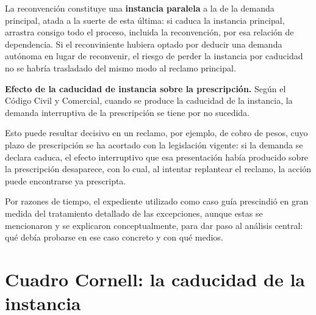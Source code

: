 \documentclass[12pt,oneside]{book}
\begin{document}
La reconvención constituye una \textbf{instancia paralela} a la de la demanda principal, atada a la suerte de esta última: si caduca la instancia principal, arrastra consigo todo el proceso, incluida la reconvención, por esa relación de dependencia. Si el reconviniente hubiera optado por deducir una demanda autónoma en lugar de reconvenir, el riesgo de perder la instancia por caducidad no se habría trasladado del mismo modo al reclamo principal.

\begin{important}
\textbf{Efecto de la caducidad de instancia sobre la prescripción.} Según el Código Civil y Comercial, cuando se produce la caducidad de la instancia, la demanda interruptiva de la prescripción se tiene por no sucedida.

Esto puede resultar decisivo en un reclamo, por ejemplo, de cobro de pesos, cuyo plazo de prescripción se ha acortado con la legislación vigente: si la demanda se declara caduca, el efecto interruptivo que esa presentación había producido sobre la prescripción desaparece, con lo cual, al intentar replantear el reclamo, la acción puede encontrarse ya prescripta.
\end{important}

Por razones de tiempo, el expediente utilizado como caso guía prescindió en gran medida del tratamiento detallado de las excepciones, aunque estas se mencionaron y se explicaron conceptualmente, para dar paso al análisis central: qué debía probarse en ese caso concreto y con qué medios.

\section*{Cuadro Cornell: la caducidad de la instancia}
\end{document}
